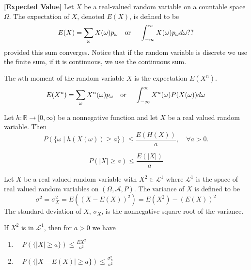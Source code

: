 \documentclass[../main.tex]{subfiles}
\begin{document}
\begin{definition}\textbf{[Expected Value]}\label{def:expected value}
Let $X$ be a real-valued random variable on a countable space $\Omega$. The expectation of $X$, denoted $E(X)$, is defined to be 
\[
E(X) = \sum_{\omega}{X(\omega)p_\omega} \quad \textnormal{or } \quad \int_{-\infty}^{\infty}X(\omega)p_\omega d\omega??
\]
provided this sum converges. Notice that if the random variable is discrete we use the finite sum, if it is continuous, we use the continuous sum.
\end{definition}

\begin{definition}
The $n$th moment of the random variable $X$ is the expectation $E(X^n)$. 
\[
E(X^n) = \sum_{\omega}{X^n(\omega)p_\omega} \quad \textnormal{or } \quad \int_{-\infty}^{\infty}X^n(\omega)P(X(\omega)) d\omega
\]
\end{definition}



\begin{theorem}
Let $h: \mathbb{R} \to [0,\infty)$ be a nonnegative function and let $X$ be a real valued random variable. Then 
\[
P(\{\omega \mid h(X(\omega)) \geq a\}) \leq \frac{E(H(X))}{a}, \quad \forall a > 0.
\]
\end{theorem}



\begin{corollary} \label{Markovs Inequality}
\[
P({|X| \geq a}) \leq \frac{E(|X|)}{a}
\]

\end{corollary}



\begin{definition}\label{def: Variance and Standard Deviation}
Let $X$ be a real valued random variable with $X^2 \in \mathcal{L}^1$ where $\mathcal{L}^1$ is the space of real valued random variables on $(\Omega, \mathcal{A}, P)$. The variance of $X$ is defined to be
\[
\sigma^2 = \sigma^2_X = E((X - E(X))^2) = E(X^2) - (E(X))^2
\]
The standard deviation of $X$, $\sigma_X$, is the nonnegative square root of the variance. 

\end{definition}






\begin{corollary}
If $X^2$ is in $\mathcal{L}^1$, then for $a>0$ we have
\begin{enumerate}
    \item $ \quad P(\{|X| \geq a\}) \leq \frac{E{X^2}}{a^2}$
    \item $ \quad P(\{|X - E(X)| \geq a\}) \leq \frac{\sigma^2_X}{a^2}$
\end{enumerate}

\end{corollary}
\end{document}
